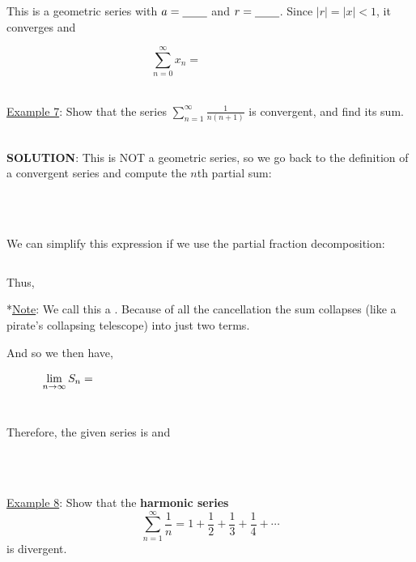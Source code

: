 \documentclass[paper=a4, fontsize=11pt]{scrartcl} %
\numberwithin{equation}{section} %
\numberwithin{figure}{section} %
\numberwithin{table}{section} %
\newcommand{\ds}{\displaystyle}
\begin{document}
  This is a geometric series with $a=\underline{\hspace{0.3in}}$ and $r=\underline{\hspace{0.3in}}$. Since $|r|=|x|<1$, it converges and
  
  \[\ds\sum_{n=0}^\infty x_n = \hspace{1in}\]
  \indent\\
  \indent
  
  \underline{Example 7}: Show that the series $\ds\sum_{n=1}^\infty \ds\frac{1}{n(n+1)}$ is convergent, and find its sum.\\
  \indent\\
  \indent
  
  \textbf{SOLUTION}: This is NOT a geometric series, so we go back to the definition of a convergent series and compute the $n$th partial sum:
  
  \[\text{ }\]
  \indent\\
  \indent\\
  \indent
  
  We can simplify this expression if we use the partial fraction decomposition:
  
  \[\text{ }\]
  \indent
  
  Thus,
  \vspace{2.75in}
  
  *\underline{Note}: We call this a \underline{\hspace{1.25in}} \underline{\hspace{0.3in}}. Because of all the cancellation the sum collapses (like a pirate's collapsing telescope) into just two terms.\\
  \indent
  
  And so we then have,
  
  \[\ds\lim_{n\to\infty}S_n = \hspace{3.5in}\]
  \indent\\
  \indent
  
  Therefore, the given series is \underline{\hspace{1.25in}} and \\
  
  \[\text{ }\]
  
  \indent\\
  \indent\\
  \indent
  
  \newpage
  \underline{Example 8}: Show that the \textbf{harmonic series}
  \[\ds\sum_{n=1}^\infty \ds\frac{1}{n} = 1 + \ds\frac{1}{2} + \ds\frac{1}{3} + \ds\frac{1}{4} + \cdots\]
  is divergent.\\
  \indent
  
\end{document}
